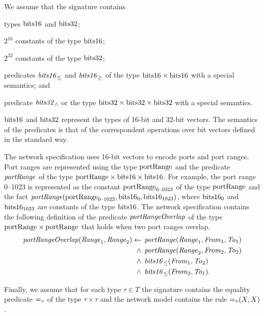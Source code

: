 We assume that the signature contains
\begin{enumerate*}[label=(\roman*)]
  \item types $\mathrm{bits16}$ and $\mathrm{bits32}$;
  \item $2^{16}$ constants of the type $\mathrm{bits16}$;
  \item $2^{32}$ constants of the type $\mathrm{bits32}$;
  \item predicates $\mathit{bits16}_{\le}$ and $\mathit{bits16}_{\ge}$ of the type $\mathrm{bits16} \times \mathrm{bits16}$ with a special semantics; and
  \item predicate $\mathit{bits32}_\wedge$ or the type $\mathrm{bits32}\times\mathrm{bits32}\times\mathrm{bits32}$ with a special semantics.
\end{enumerate*}
$\mathrm{bits16}$ and $\mathrm{bits32}$ represent the types of 16-bit and 32-bit vectors. The semantics of the predicates is that of the correspondent operations over bit vectors defined in the standard way.

The network specification uses 16-bit vectors to encode ports and port ranges. Port ranges are represented using the type $\mathrm{portRange}$ and the predicate $\mathit{portRange}$ of the type $\mathrm{portRange}\times\mathrm{bits16}\times\mathrm{bits16}$. For example, the port range 0--1023 is represented as the constant $\mathrm{portRange}_\text{0--1023}$ of the type $\mathrm{portRange}$ and the fact $\mathit{portRange}(\mathrm{portRange}_\text{0--1023},\allowbreak\mathrm{bits16}_0,\allowbreak\mathrm{bits16}_{1023})$, where $\mathrm{bits16}_0$ and $\mathrm{bits16}_{1023}$ are constants of the type $\mathrm{bits16}$. The network specification contains the following definition of the predicate $\mathit{portRangeOverlap}$ of the type $\mathrm{portRange}\times\mathrm{portRange}$ that holds when two port ranges overlap.
\begin{equation*}
  \begin{aligned}
\mathit{portRangeOverlap}(\mathit{Range}_1,\mathit{Range}_2)\leftarrow\:&\:\mathit{portRange}(\mathit{Range}_1,\mathit{From}_1,\mathit{To}_1) \\
  \wedge\:&\:\mathit{portRange}(\mathit{Range}_2,\mathit{From}_2,\mathit{To}_2) \\
  \wedge\:&\:\mathit{bits16}_\le(\mathit{From}_1,\mathit{To}_2) \\
  \wedge\:&\:\mathit{bits16}_\le(\mathit{From}_2,\mathit{To}_1).
  \end{aligned}
\end{equation*}

Finally, we assume that for each type $\tau\in T$ the signature contains the equality predicate $\mathit{=}_\tau$ of the type $\tau\times\tau$ and the network model contains the rule $\mathit{=}_\tau(X,X)$.

